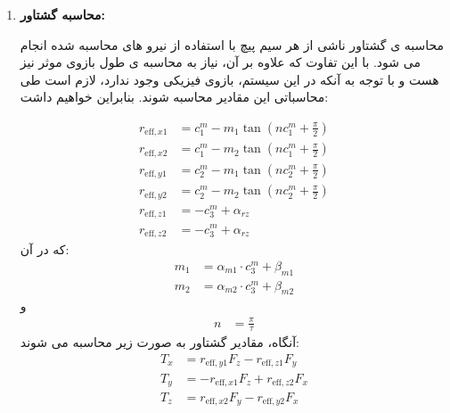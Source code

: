 \begin{enumerate}
	با در اختیار داشتن $c^{m}$، می توان بر اساس رابطه شناسایی شده به صورت زیر نیروی برایند ناشی از جریان های الکتریکی I را محاسبه کرد. 
	\begin{align}
		F_x &= K_x \cos(\eta_x) \sin(\eta_y) \\
		F_y &= K_y \sin(\eta_x) \cos(\eta_y) \\
		F_z &= K_z \sin(\eta_x) \sin(\eta_y)
		\label{eq:method-force-components}
	\end{align}
	که پارامتر های استفاده شده در این رابطه به صورت زیر است:
	
	\begin{align}
		\eta_x &= \frac{\pi}{\tau} \cdot c^{m}_1, \quad 
		\eta_y = \frac{\pi}{\tau} \cdot c^{m}_2
		\label{eq:method-eta}
	\end{align}
	\begin{align}
		K_x &= \alpha_x e^{\beta_k \cdot c^{m}_3}, \quad
		K_y = \alpha_y e^{\beta_k \cdot c^{m}_3}, \quad
		K_z = \alpha_z e^{\beta_k \cdot c^{m}_3}
		\label{eq:method-Kfactors}
	\end{align}
	\item \textbf{محاسبه گشتاور:}
	
	محاسبه ی گشتاور ناشی از هر سیم پیچ با استفاده از نیرو های محاسبه شده انجام می شود. با این تفاوت که علاوه بر آن، نیاز به محاسبه ی طول بازوی موثر نیز هست و با توجه به آنکه در این سیستم، بازوی فیزیکی وجود ندارد، لازم است طی محاسباتی این مقادیر محاسبه شوند. بنابراین خواهیم داشت:
	
	\begin{align}
		r_{\text{eff},x1} &= c^{m}_1 - m_1 \tan(n c^{m}_1 + \frac{\pi}{2}) \\
		r_{\text{eff},x2} &= c^{m}_1 - m_2 \tan(n c^{m}_1 + \frac{\pi}{2}) \\
		r_{\text{eff},y1} &= c^{m}_2 - m_1 \tan(n c^{m}_2 + \frac{\pi}{2}) \\
		r_{\text{eff},y2} &= c^{m}_2 - m_2 \tan(n c^{m}_2 + \frac{\pi}{2}) \\
		r_{\text{eff},z1} &= -c^{m}_3 + \alpha_{rz} \\
		r_{\text{eff},z2} &= -c^{m}_3 + \alpha_{rz}
		\label{eq:method-effective-arms}
	\end{align}
	که در آن:
	\begin{align}
		m_1 &= \alpha_{m1} \cdot c^{m}_3 + \beta_{m1} \\
		m_2 &= \alpha_{m2} \cdot c^{m}_3 + \beta_{m2}
		\label{eq:method-m-params}
	\end{align}
	و
	\begin{align}
		n &= \frac{\pi}{\tau}
		\label{eq:method-n-param}
	\end{align}
	آنگاه، مقادیر گشتاور به صورت زیر محاسبه می شوند:
	\begin{align}
		T_x &= r_{\text{eff},y1} F_z - r_{\text{eff},z1} F_y \\
		T_y &= -r_{\text{eff},x1} F_z + r_{\text{eff},z2} F_x \\
		T_z &= r_{\text{eff},x2} F_y - r_{\text{eff},y2} F_x
		\label{eq:method-torque-components}
	\end{align}
	

\end{enumerate}
